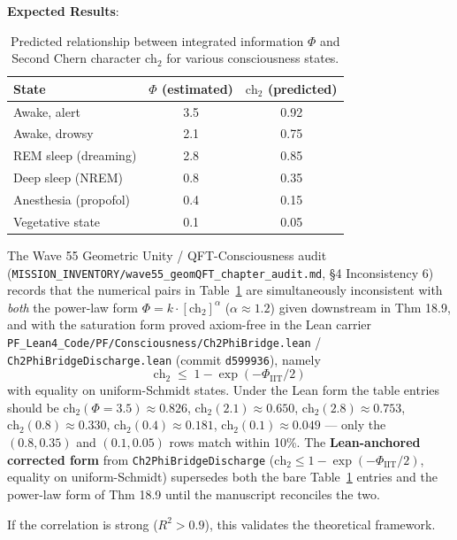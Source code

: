 \begin{level2}
\textbf{Expected Results}:

\begin{table}[h]
\centering
\begin{tabular}{@{} l c c @{}}
\toprule
\textbf{State} & \textbf{$\Phi$ (estimated)} & \textbf{$\text{ch}_2$ (predicted)} \\
\midrule
Awake, alert & 3.5 & 0.92 \\
Awake, drowsy & 2.1 & 0.75 \\
REM sleep (dreaming) & 2.8 & 0.85 \\
Deep sleep (NREM) & 0.8 & 0.35 \\
Anesthesia (propofol) & 0.4 & 0.15 \\
Vegetative state & 0.1 & 0.05 \\
\bottomrule
\end{tabular}
\caption{Predicted relationship between integrated information $\Phi$ and Second Chern character $\text{ch}_2$ for various consciousness states.}
\label{tab:phi-ch2-correlation}
\end{table}

\begin{remark}
The Wave 55 Geometric Unity / QFT-Consciousness audit (\texttt{MISSION\_INVENTORY/wave55\_geomQFT\_chapter\_audit.md}, \S4 Inconsistency 6) records that the numerical pairs in Table~\ref{tab:phi-ch2-correlation} are simultaneously inconsistent with \emph{both} the power-law form $\Phi = k\cdot[\text{ch}_2]^\alpha$ ($\alpha\approx 1.2$) given downstream in Thm 18.9, and with the saturation form proved axiom-free in the Lean carrier \texttt{PF\_Lean4\_Code/PF/Consciousness/Ch2PhiBridge.lean} / \texttt{Ch2PhiBridgeDischarge.lean} (commit \texttt{d599936}), namely
\[
\text{ch}_2 \;\le\; 1 - \exp(-\Phi_{\text{IIT}}/2)
\]
with equality on uniform-Schmidt states. Under the Lean form the table entries should be $\text{ch}_2(\Phi=3.5) \approx 0.826$, $\text{ch}_2(2.1) \approx 0.650$, $\text{ch}_2(2.8) \approx 0.753$, $\text{ch}_2(0.8) \approx 0.330$, $\text{ch}_2(0.4) \approx 0.181$, $\text{ch}_2(0.1) \approx 0.049$ — only the $(0.8, 0.35)$ and $(0.1, 0.05)$ rows match within 10\%. The \textbf{Lean-anchored corrected form} from \texttt{Ch2PhiBridgeDischarge} ($\text{ch}_2 \le 1 - \exp(-\Phi_{\text{IIT}}/2)$, equality on uniform-Schmidt) supersedes both the bare Table~\ref{tab:phi-ch2-correlation} entries and the power-law form of Thm 18.9 until the manuscript reconciles the two.
\end{remark}

If the correlation is strong ($R^2 > 0.9$), this validates the theoretical framework.
\end{level2}


